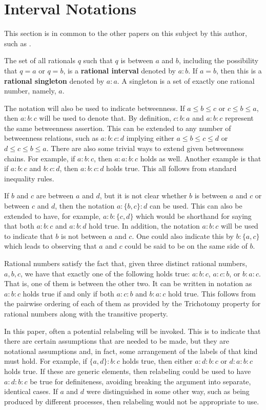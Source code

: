 \documentclass[12pt]{article}
\begin{document}
\section{Interval Notations}

This section is in common to the other papers on this subject by this author, such as \cite{taylor24dedekind}.

The set of all rationals $q$ such that $q$ is between $a$ and $b$, including the possibility that $q=a$ or $q=b$, is a \textbf{rational interval} denoted by $a:b$. If $a=b$, then this is a \textbf{rational singleton} denoted by $a:a$. A singleton is a set of exactly one rational number, namely, $a$. 

The notation will also be used to indicate betweenness. If $a \leq b \leq c$ or $c \leq b \leq a$, then $a:b:c$ will be used to denote that. By definition, $c:b:a$ and $a:b:c$ represent the same betweenness assertion. This can be extended to any number of betweenness relations, such as $a:b:c:d$ implying either $a \leq b \leq c \leq d$ or $d \leq c \leq b \leq a$. There are also some trivial ways to extend given betweenness chains. For example, if $a:b:c$, then $a:a:b:c$ holds as well. Another example is that if $a:b:c$ and $b:c:d$, then $a:b:c:d$ holds true. This all follows from standard inequality rules. 

If $b$ and $c$ are between $a$ and $d$, but it is not clear whether $b$ is between $a$ and $c$ or between $c$ and $d$, then the notation $a:\{b,c\}:d$ can be used. This can also be extended to have, for example, $a:b:\{c,d\}$ which would be shorthand for saying that both $a:b:c$ and $a:b:d$ hold true. In addition, the notation \sout{$a:b:c$} will be used to indicate that $b$ is not between $a$ and $c$. One could also indicate this by $b:\{a,c\}$ which leads to observing that $a$ and $c$ could be said to be on the same side of $b$. 

Rational numbers satisfy the fact that, given three distinct rational numbers, $a, b, c$, we have that exactly one of the following holds true: $a:b:c$, $a:c:b$, or $b:a:c$. That is, one of them is between the other two. It can be written in notation as $a:b:c$ holds true if and only if both \sout{$a:c:b$} and \sout{$b:a:c$} hold true. This follows from the pairwise ordering of each of them as provided by the Trichotomy property for rational numbers along with the transitive property. 

In this paper, often a potential relabeling will be invoked. This is to indicate that there are certain assumptions that are needed to be made, but they are notational assumptions and, in fact, some arrangement of the labels of that kind must hold. For example, if $\{a,d\}:b:c$ holds true, then either $a:d:b:c$ or $d:a:b:c$ holds true. If these are generic elements, then relabeling could be used to have $a:d:b:c$  be  true for definiteness, avoiding breaking the argument into separate, identical cases. If $a$ and $d$ were distinguished in some other way, such as being produced by different processes, then relabeling would not be appropriate to use. 
\end{document}
